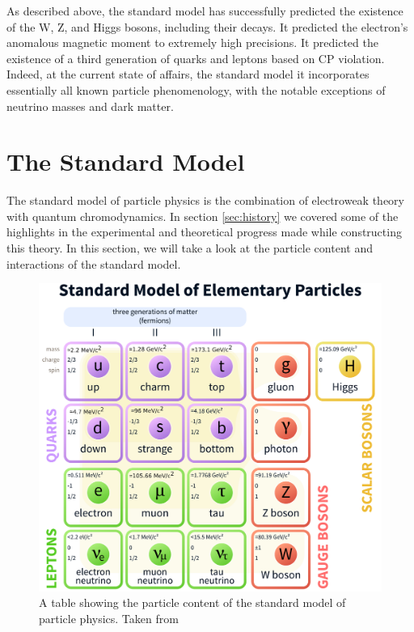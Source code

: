     As described above, the standard model has successfully predicted the existence of the W, Z, and Higgs bosons, including their decays. It predicted the electron's anomalous magnetic moment to extremely high precisions. It predicted the existence of a third generation of quarks and leptons based on CP violation. Indeed, at the current state of affairs, the standard model it incorporates essentially all known particle phenomenology, with the notable exceptions of neutrino masses and dark matter.

\section{The Standard Model}
  The standard model of particle physics is the combination of electroweak theory with quantum chromodynamics. In section \ref{sec:history} we covered some of the highlights in the experimental and theoretical progress made while constructing this theory. In this section, we will take a look at the particle content and interactions of the standard model. 

  \begin{figure}[h!]
    \centering
    \includegraphics[width=\textwidth]{figures/standard_model_2.pdf}
    \caption{A table showing the particle content of the standard model of particle physics. Taken from \cite{SM_wiki}}
    \label{fig:standard_model}
  \end{figure}  

